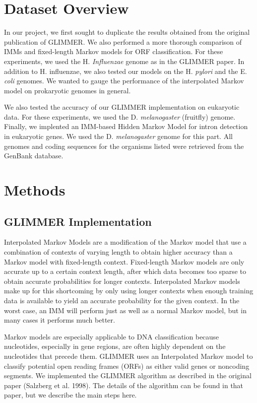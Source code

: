\documentclass[11pt,letterpaper]{article}
\begin{document}
\section{Dataset Overview}

In our project, we first sought to duplicate the results obtained from the original publication of GLIMMER. We also performed a more thorough comparison of IMMs and fixed-length Markov models for ORF classification. For these experiments, we used the H. \emph{Influenzae} genome as in the GLIMMER paper. In addition to H. influenzae, we also tested our models on the H. \emph{pylori} and the E. \emph{coli} genomes. We wanted to gauge  the performance of the interpolated Markov model on prokaryotic genomes in general.


We also tested the accuracy of our GLIMMER implementation on eukaryotic data. For these experiments, we used the D. \emph{melanogaster} (fruitfly) genome. Finally, we implented an IMM-based Hidden Markov Model for intron detection in eukaryotic genes. We used the D. \emph{melanogaster} genome for this part. All genomes and coding sequences for the organisms listed were retrieved from the GenBank database.

\section{Methods}
\subsection{GLIMMER Implementation}

Interpolated Markov Models are a modification of the Markov model that use a combination of contexts of varying length to obtain higher accuracy than a Markov model with fixed-length context. Fixed-length Markov models are only accurate up to a certain context length, after which data becomes too sparse to obtain accurate probabilities for longer contexts. Interpolated Markov models make up for this shortcoming by only using longer contexts when enough training data is available to yield an accurate probability for the given context. In the worst case, an IMM will perform just as well as a normal Markov model, but in many cases it performs much better. 

Markov models are especially applicable to DNA classification because nucleotides, especially in gene regions, are often highly dependent on the nucleotides that precede them. GLIMMER uses an Interpolated Markov model to classify potential open reading frames (ORFs) as either valid genes or noncoding segments. We implemented the GLIMMER algorithm as described in the original paper (Salzberg et al. 1998). The details of the algorithm can be found in that paper, but we describe the main steps here.
\end{document}
